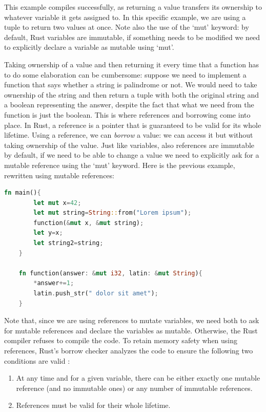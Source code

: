 \documentclass{report}
\begin{document}
This example compiles successfully, as returning a value transfers its ownership to whatever variable it gets assigned to. In this specific example, we are using a tuple to return
two values at once. Note also the use of the \enquote*{mut} keyword: by default, Rust variables are immutable, if something needs to be modified we need to explicitly declare a
variable as mutable using \enquote*{mut}. \par

Taking ownership of a value and then returning it every time that a function has to do some elaboration can be cumbersome: suppose we need to implement a function that says whether
a string is palindrome or not. We would need to take ownership of the string and then return a tuple with both the original string and a boolean representing the answer, despite
the fact that what we need from the function is just the boolean. This is where references and borrowing come into place. In Rust, a reference is a pointer that is guaranteed to be
valid for its whole lifetime. Using a reference, we can \textit{borrow} a value: we can access it but without taking ownership of the value. Just like variables, also references
are immutable by default, if we need to be able to change a value we need to explicitly ask for a mutable reference using the \enquote*{mut} keyword. Here is the previous example,
rewritten using mutable references:

\begin{lstlisting}[language=Rust, style=colouredRust]
    fn main(){
       	let mut x=42;
        let mut string=String::from("Lorem ipsum");
        function(&mut x, &mut string);
        let y=x;
        let string2=string;
    }

    fn function(answer: &mut i32, latin: &mut String){
       	*answer+=1;
        latin.push_str(" dolor sit amet");
    }	
\end{lstlisting}

Note that, since we are using references to mutate variables, we need both to ask for mutable references and declare the variables as mutable. Otherwise, the Rust compiler refuses
to compile the code. To retain memory safety when using references, Rust's borrow checker analyzes the code to ensure the following two conditions are valid
\cite{rust_ownership_rules}:

\begin{enumerate}
		\item At any time and for a given variable, there can be either exactly one mutable reference (and no immutable ones) or any number of immutable references.
		\item References must be valid for their whole lifetime.
\end{enumerate}
\end{document}
